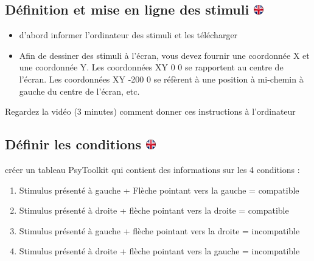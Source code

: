 \documentclass[
]{book}
\providecommand{\tightlist}{%
  \setlength{\itemsep}{0pt}\setlength{\parskip}{0pt}}
\begin{document}
\hypertarget{duxe9finition-et-mise-en-ligne-des-stimuli}{%
\subsection[Définition et mise en ligne des stimuli
]{\texorpdfstring{Définition et mise en ligne des stimuli
\href{https://www.psytoolkit.org/lessons/project.html\#_stimuli_definition_and_upload}{\protect\includegraphics{img/ukflag.png}}}{Définition et mise en ligne des stimuli }}\label{duxe9finition-et-mise-en-ligne-des-stimuli}}

\begin{itemize}
\tightlist
\item
  d'abord informer l'ordinateur des stimuli et les télécharger
\item
  Afin de dessiner des stimuli à l'écran, vous devez fournir une
  coordonnée X et une coordonnée Y. Les coordonnées XY 0 0 se rapportent
  au centre de l'écran. Les coordonnées XY -200 0 se réfèrent à une
  position à mi-chemin à gauche du centre de l'écran, etc.
\end{itemize}

Regardez la vidéo (3 minutes) comment donner ces instructions à
l'ordinateur

\hypertarget{duxe9finir-les-conditions}{%
\subsection[Définir les conditions ]{\texorpdfstring{Définir les
conditions
\href{https://www.psytoolkit.org/lessons/project.html\#_defining_conditions}{\protect\includegraphics{img/ukflag.png}}}{Définir les conditions }}\label{duxe9finir-les-conditions}}

créer un tableau PsyToolkit qui contient des informations sur les 4
conditions :

\begin{enumerate}
\def\labelenumi{\arabic{enumi}.}
\tightlist
\item
  Stimulus présenté à gauche + Flèche pointant vers la gauche =
  compatible
\item
  Stimulus présenté à droite + flèche pointant vers la droite =
  compatible
\item
  Stimulus présenté à gauche + flèche pointant vers la droite =
  incompatible
\item
  Stimulus présenté à droite + flèche pointant vers la gauche =
  incompatible
\end{enumerate}
\end{document}
